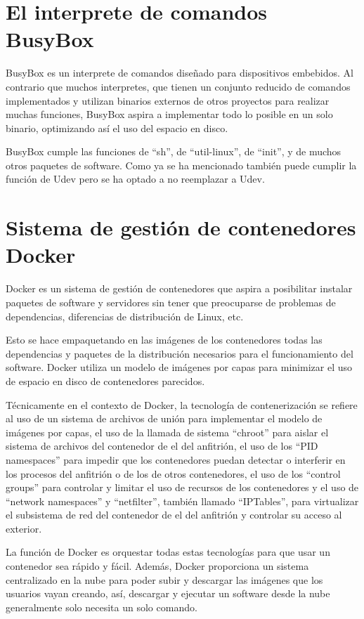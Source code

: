 \documentclass{tfg}
\begin{document}
\section{El interprete de comandos BusyBox}
BusyBox es un interprete de comandos diseñado para dispositivos embebidos. Al contrario que muchos interpretes, que tienen un conjunto reducido de comandos implementados y utilizan binarios externos de otros proyectos para realizar muchas funciones, BusyBox aspira a implementar todo lo posible en un solo binario, optimizando así el uso del espacio en disco.

BusyBox cumple las funciones de ``sh'', de ``util-linux'', de ``init'', y de muchos otros paquetes de software. Como ya se ha mencionado también puede cumplir la función de Udev pero se ha optado a no reemplazar a Udev.

\section{Sistema de gestión de contenedores Docker}
Docker es un sistema de gestión de contenedores que aspira a posibilitar instalar paquetes de software y servidores sin tener que preocuparse de problemas de dependencias, diferencias de distribución de Linux, etc.

Esto se hace empaquetando en las imágenes de los contenedores todas las dependencias y paquetes de la distribución necesarios para el funcionamiento del software. Docker utiliza un modelo de imágenes por capas para minimizar el uso de espacio en disco de contenedores parecidos.

Técnicamente en el contexto de Docker, la tecnología de contenerización se refiere al uso de un sistema de archivos de unión para implementar el modelo de imágenes por capas, el uso de la llamada de sistema ``chroot'' para aislar el sistema de archivos del contenedor de el del anfitrión, el uso de los ``PID namespaces'' para impedir que los contenedores puedan detectar o interferir en los procesos del anfitrión o de los de otros contenedores, el uso de los ``control groups'' para controlar y limitar el uso de recursos de los contenedores y el uso de ``network namespaces'' y ``netfilter'', también llamado ``IPTables'', para virtualizar el subsistema de red del contenedor de el del anfitrión y controlar su acceso al exterior.

La función de Docker es orquestar todas estas tecnologías para que usar un contenedor sea rápido y fácil. Además, Docker proporciona un sistema centralizado en la nube para poder subir y descargar las imágenes que los usuarios vayan creando, así, descargar y ejecutar un software desde la nube generalmente solo necesita un solo comando.
\end{document}
